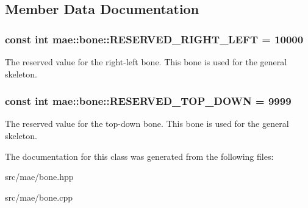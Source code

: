 \subsection{Member Data Documentation}
\hypertarget{classmae_1_1bone_a88742a35692365039e79b7b66445098c}{
\subsubsection[{R\-E\-S\-E\-R\-V\-E\-D\-\_\-\-R\-I\-G\-H\-T\-\_\-\-L\-E\-F\-T}]{\setlength{\rightskip}{0pt plus 5cm}const int mae\-::bone\-::\-R\-E\-S\-E\-R\-V\-E\-D\-\_\-\-R\-I\-G\-H\-T\-\_\-\-L\-E\-F\-T = 10000\hspace{0.3cm}{\ttfamily [static]}}}\label{classmae_1_1bone_a88742a35692365039e79b7b66445098c}
The reserved value for the right-\/left bone. This bone is used for the general skeleton. \hypertarget{classmae_1_1bone_a99d8ad741f1c2d4bd8ad199286c3911c}{
\subsubsection[{R\-E\-S\-E\-R\-V\-E\-D\-\_\-\-T\-O\-P\-\_\-\-D\-O\-W\-N}]{\setlength{\rightskip}{0pt plus 5cm}const int mae\-::bone\-::\-R\-E\-S\-E\-R\-V\-E\-D\-\_\-\-T\-O\-P\-\_\-\-D\-O\-W\-N = 9999\hspace{0.3cm}{\ttfamily [static]}}}\label{classmae_1_1bone_a99d8ad741f1c2d4bd8ad199286c3911c}
The reserved value for the top-\/down bone. This bone is used for the general skeleton. 

The documentation for this class was generated from the following files\-:\begin{DoxyCompactItemize}
\item 
src/mae/bone.\-hpp\item 
src/mae/bone.\-cpp\end{DoxyCompactItemize}
